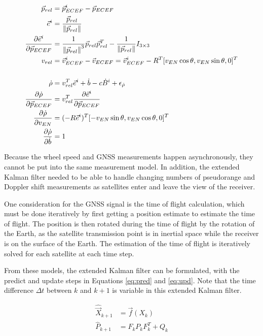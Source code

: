 \documentclass[letterpaper,times]{IONconf}
\begin{document}
\begin{equation}
    \begin{aligned}
        \vec{p}_{rel} &= \vec{p}^i_{ECEF}-\vec{p}_{ECEF}\\
        \vec{e}^i &=  \frac{ \vec{p}_{rel} }{ \left\lVert\vec{p}_{rel}\right\rVert}\\
        \frac{ \partial \vec{e}^i}{\partial \vec{p}_{ECEF} } &= 
        \frac{ 1}{ \left\lVert\vec{p}_{rel}\right\rVert^{3}} \vec{p}_{rel} \vec{p}_{rel}^T - \frac{1}{\left\lVert\vec{p}_{rel}\right\rVert} I_{3\times3}\\
        v_{rel} &= \vec{v}_{ECEF}^i-\vec{v}_{ECEF} = \vec{v}_{ECEF}^i-R^T [v_{EN} \cos \theta, v_{EN}\sin\theta,0]^T\\\\
        \dot\rho &= v_{rel}^T \vec{e}^i + \dot{b} - c\dot{B}^i + \epsilon_{\dot{\rho}}\\
        \frac{ \partial \dot\rho}{\partial \vec{p}_{ECEF} } &= v_{rel}^T \frac{ \partial \vec{e}^i}{\partial \vec{p}_{ECEF} }\\
        \frac{ \partial \dot\rho}{\partial v_{EN} } &= (-R \vec{e}^i)^T [-v_{EN}\sin\theta,v_{EN}\cos\theta,0]^T\\
        \frac{ \partial \dot\rho}{\partial \dot{b} } &= 1
    \end{aligned} \label{eq:rhor}
\end{equation}

Because the wheel speed and GNSS measurements happen asynchronously, they cannot be put into the same measurement model. In addition, the extended Kalman filter needed to be able to handle changing numbers of pseudorange and Doppler shift measurements as satellites enter and leave the view of the receiver. 

One consideration for the GNSS signal is the time of flight calculation, which must be done iteratively by first getting a position estimate to estimate the time of flight. The position is then rotated during the time of flight by the rotation of the Earth, as the satellite transmission point is in inertial space while the receiver is on the surface of the Earth. The estimation of the time of flight is iteratively solved for each satellite at each time step. 

From these models, the extended Kalman filter can be formulated, with the predict and update steps in Equations \eqref{eq:pred} and \eqref{eq:upd}. Note that the time difference $\Delta t$ between $k$ and $k+1$ is variable in this extended Kalman filter.

\begin{equation}
    \begin{aligned}
        \hat{\vec{X}}_{k+1} &= \vec{f}(X_k) \\
        \hat{P}_{k+1} &= F_k P_k F_k^T + Q_k\\
    \end{aligned} \label{eq:pred}
\end{equation}
\end{document}
